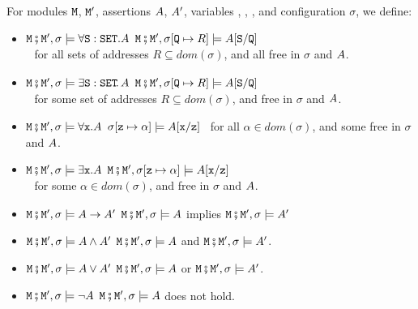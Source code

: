 \begin{definition}  
\label{def:valid:assertion:logical}
For modules $\M$, $\M'$, assertions $\A$, $\A'$, variables , , ,  and configuration $\sigma$, we define$:$
\begin{itemize}
\item
$\M\mkpair \M', \sigma \models \forall \prg{S}:\prg{SET}.\A$ \IFF  $\M\mkpair \M', \sigma[\prg{Q}\mapsto R] \models  \A[\prg{S}/\prg{Q}]$ \\
$\strut ~ $ \hfill for all sets of addresses $R\subseteq dom(\sigma)$, and  all  free in $\sigma$ and $\A$.
\item
$\M\mkpair \M', \sigma \models \exists \prg{S}:\prg{SET}\!.\,\A$ \IFF  $\M\mkpair \M', \sigma[\prg{Q}\mapsto R] \models  \A[\prg{S}/\prg{Q}]$ \\
 $\strut ~ $ \hfill  for some set of addresses $R\subseteq dom(\sigma)$, and    free in $\sigma$ and $\A$.
\item
$\M\mkpair \M', \sigma \models \forall \prg{x}.\A$ \IFF
$\sigma[\prg{z}\mapsto \alpha] \models  \A[\prg{x}/\prg{z}]$ \ for all  $\alpha\in dom(\sigma)$, and  some  free in $\sigma$ and $\A$.
\item
$\M\mkpair \M', \sigma \models \exists \prg{x}.\A$ \IFF
$\M\mkpair \M', \sigma[\prg{z}\mapsto \alpha] \models  \A[\prg{x}/\prg{z}]$\\
$\strut ~ $ \hfill for some  $\alpha\in dom(\sigma)$, and    free in $\sigma$ and $\A$.
\item
$\M\mkpair \M', \sigma \models \A \rightarrow \A' $ \IFF  $\M\mkpair \M', \sigma \models \A $ implies $\M\mkpair \M', \sigma \models \A' $
\item
$\M\mkpair \M', \sigma \models  \A \wedge \A'$   \IFF  $\M\mkpair \M', \sigma \models  \A $
and $\M\mkpair \M', \sigma \models  \A'$.
\item
$\M\mkpair \M', \sigma \models  \A \vee \A'$   \IFF  $\M\mkpair \M', \sigma \models  \A $
or $\M\mkpair \M', \sigma \models  \A'$.
\item
$\M\mkpair \M', \sigma \models  \neg\A$   \IFF  $\M\mkpair \M', \sigma \models  \A $
does not hold.
\end{itemize}
\end{definition}

